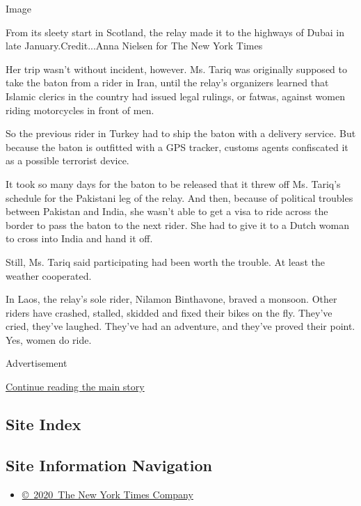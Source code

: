 Image

From its sleety start in Scotland, the relay made it to the highways of
Dubai in late January.Credit...Anna Nielsen for The New York Times

Her trip wasn't without incident, however. Ms. Tariq was originally
supposed to take the baton from a rider in Iran, until the relay's
organizers learned that Islamic clerics in the country had issued legal
rulings, or fatwas, against women riding motorcycles in front of men.

So the previous rider in Turkey had to ship the baton with a delivery
service. But because the baton is outfitted with a GPS tracker, customs
agents confiscated it as a possible terrorist device.

It took so many days for the baton to be released that it threw off Ms.
Tariq's schedule for the Pakistani leg of the relay. And then, because
of political troubles between Pakistan and India, she wasn't able to get
a visa to ride across the border to pass the baton to the next rider.
She had to give it to a Dutch woman to cross into India and hand it off.

Still, Ms. Tariq said participating had been worth the trouble. At least
the weather cooperated.

In Laos, the relay's sole rider, Nilamon Binthavone, braved a monsoon.
Other riders have crashed, stalled, skidded and fixed their bikes on the
fly. They've cried, they've laughed. They've had an adventure, and
they've proved their point. Yes, women do ride.

Advertisement

\protect\hyperlink{after-bottom}{Continue reading the main story}

\hypertarget{site-index}{%
\subsection{Site Index}\label{site-index}}

\hypertarget{site-information-navigation}{%
\subsection{Site Information
Navigation}\label{site-information-navigation}}

\begin{itemize}
\tightlist
\item
  \href{https://help.nytimes.com/hc/en-us/articles/115014792127-Copyright-notice}{©~2020~The
  New York Times Company}
\end{itemize}

